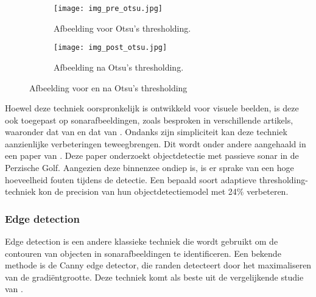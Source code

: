 \begin{figure}[H]
    \centering
    \begin{subfigure}{.5\textwidth}
        \centering
        \captionsetup{justification=centering}
        \texttt{[image: img\_pre\_otsu.jpg]}
        \caption[Afbeelding voor Otsu's thresholding]{Afbeelding voor Otsu's thresholding. \autocite{http//www.freephotos.lu/_2010}}
        \label{fig:img_pre_otsu}
    \end{subfigure}%
    \begin{subfigure}{.5\textwidth}
        \centering
        \captionsetup{justification=centering}
        \texttt{[image: img\_post\_otsu.jpg]}
        \caption[Afbeelding na Otsu's thresholding]{Afbeelding na Otsu's thresholding. \autocite{Pikez33_2010}}
        \label{fig:img_post_otsu}
    \end{subfigure}
    \caption[Afbeelding voor en na Otsu's thresholding]{Afbeelding voor en na Otsu's thresholding}
    \label{fig:imgs_otsu}
\end{figure}

Hoewel deze techniek oorspronkelijk is ontwikkeld voor visuele beelden, is deze ook toegepast op sonarafbeeldingen, zoals besproken in verschillende artikels, waaronder dat van \textcite{Yuan_2016} en dat van \textcite{Dimitrova_Grekow_2017}. Ondanks zijn simpliciteit kan deze techniek aanzienlijke verbeteringen teweegbrengen. Dit wordt onder andere aangehaald in een paper van \textcite{Komari_Alaie_2018}. Deze paper onderzoekt objectdetectie met passieve sonar in de Perzische Golf. Aangezien deze binnenzee ondiep is, is er sprake van een hoge hoeveelheid fouten tijdens de detectie. Een bepaald soort adaptieve thresholding-techniek kon de \gls{precision} van hun objectdetectiemodel met 24\% verbeteren.

\subsubsection{Edge detection}

Edge detection is een andere klassieke techniek die wordt gebruikt om de contouren van objecten in sonarafbeeldingen te identificeren. \autocite{Torre_1986} Een bekende methode is de Canny edge detector, die randen detecteert door het maximaliseren van de gradiëntgrootte. Deze techniek komt als beste uit de vergelijkende studie van \textcite{Awalludin_2022}. \\

